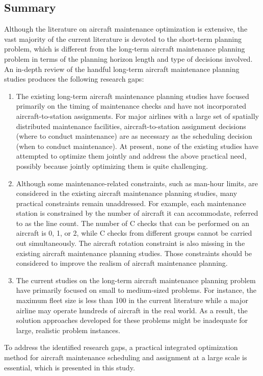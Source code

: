 \subsection{Summary}
\label{sec:LitRevSummary}
Although the literature on aircraft maintenance optimization is extensive, the vast majority of the current literature is devoted to the short-term planning problem, which is different from the long-term aircraft maintenance planning problem in terms of the planning horizon length and type of decisions involved. An in-depth review of the handful long-term aircraft maintenance planning studies produces the following research gaps:
\begin{enumerate}
    \item The existing long-term aircraft maintenance planning studies have focused primarily on the timing of maintenance checks and have not incorporated aircraft-to-station assignments.
    For major airlines with a large set of spatially distributed maintenance facilities, aircraft-to-station assignment decisions (where to conduct maintenance) are as necessary as the scheduling decision (when to conduct maintenance). 
    At present, none of the existing studies have attempted to optimize them jointly and address the above practical need,  possibly because jointly optimizing them is quite challenging.
    \item Although some maintenance-related constraints, such as man-hour limits, are considered in the existing aircraft maintenance planning studies, many practical constraints remain unaddressed. For example, each maintenance station is constrained by the number of aircraft it can accommodate, referred to as the line count. The number of C checks that can be performed on an aircraft is 0, 1, or 2, while C checks from different groups cannot be carried out simultaneously.
    The aircraft rotation constraint is also missing in the existing aircraft maintenance planning studies. Those constraints should be considered to improve the realism of aircraft maintenance planning. 
    \item The current studies on the long-term aircraft maintenance planning problem have primarily focused on small to medium-sized problems. For instance, the maximum fleet size is less than 100 in the current literature while a major airline may operate hundreds of aircraft in the real world. As a result, the solution approaches developed for these problems might be inadequate for large, realistic problem instances.
\end{enumerate}

To address the identified research gaps, a practical integrated optimization method for aircraft maintenance scheduling and assignment at a large scale is essential, which is presented in this study.  